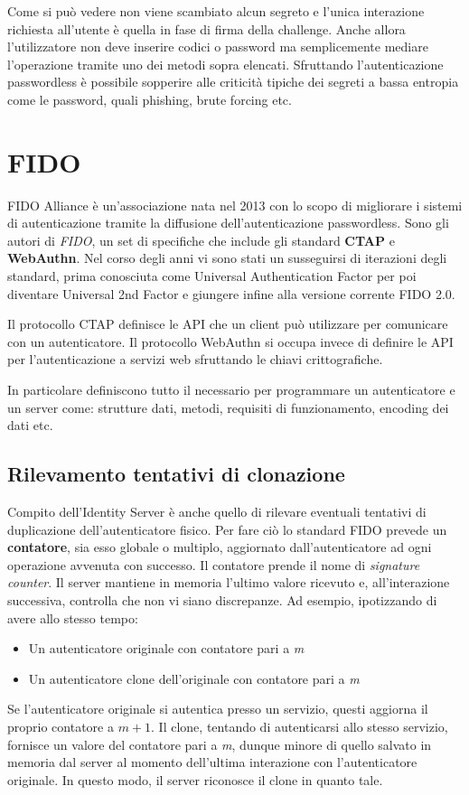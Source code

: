 Come si può vedere non viene scambiato alcun segreto e l'unica interazione richiesta all'utente è quella in fase di firma della challenge. Anche allora l'utilizzatore non deve inserire codici o password ma semplicemente mediare l'operazione tramite uno dei metodi sopra elencati. Sfruttando l'autenticazione passwordless è possibile sopperire alle criticità tipiche dei segreti a bassa entropia come le password, quali phishing, brute forcing etc. 

\section{FIDO}
\label{fido}

FIDO Alliance è un'associazione nata nel 2013 con lo scopo di migliorare i sistemi di autenticazione tramite la diffusione dell'autenticazione passwordless. Sono gli autori di \emph{FIDO}, un set di specifiche che include gli standard \textbf{CTAP} e \textbf{WebAuthn}. Nel corso degli anni vi sono stati un susseguirsi di iterazioni degli standard, prima conosciuta come Universal Authentication Factor per poi diventare Universal 2nd Factor e giungere infine alla versione corrente FIDO 2.0. 

Il protocollo CTAP definisce le API che un client può utilizzare per comunicare con un autenticatore. Il protocollo WebAuthn si occupa invece di definire le API per l'autenticazione a servizi web sfruttando le chiavi crittografiche. 

In particolare definiscono tutto il necessario per programmare un autenticatore e un server come: strutture dati, metodi, requisiti di funzionamento, encoding dei dati etc.

\subsection{Rilevamento tentativi di clonazione}
\label{fido:clonazione}

Compito dell'Identity Server è anche quello di rilevare eventuali tentativi di duplicazione dell'autenticatore fisico. Per fare ciò lo standard FIDO prevede un \textbf{contatore}, sia esso globale o multiplo, aggiornato dall'autenticatore ad ogni operazione avvenuta con successo. Il contatore prende il nome di \emph{signature counter}. Il server mantiene in memoria l'ultimo valore ricevuto e, all'interazione successiva, controlla che non vi siano discrepanze. Ad esempio, ipotizzando di avere allo stesso tempo:
\begin{itemize}
	\item Un autenticatore originale con contatore pari a \emph{m}
	\item Un autenticatore clone dell'originale con contatore pari a \emph{m}
\end{itemize}
Se l'autenticatore originale si autentica presso un servizio, questi aggiorna il proprio contatore a ${m+1}$. Il clone, tentando di autenticarsi allo stesso servizio, fornisce un valore del contatore pari a \emph{m}, dunque minore di quello salvato in memoria dal server al momento dell'ultima interazione con l'autenticatore originale. In questo modo, il server riconosce il clone in quanto tale. 

